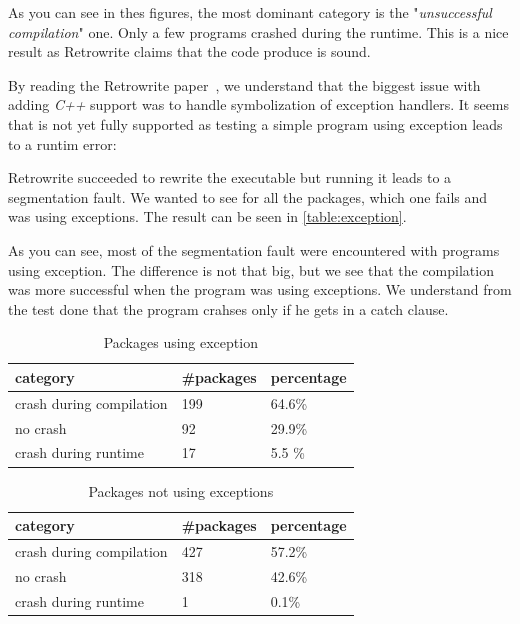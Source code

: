 \documentclass[a4paper,11pt,oneside]{report}
\newcommand{\sysname}{Retrowrite\xspace}
\begin{document}
As you can see in thes figures, the most dominant category is the
"\textit{unsuccessful compilation}" one. Only a few programs crashed during the
runtime. This is a nice result as \sysname claims that the code produce is
sound.

By reading the \sysname paper~\cite{dinesh20oakland}, we understand that
the biggest issue with adding \textit{C++} support was to handle symbolization
of exception handlers. It seems that is not yet fully supported as testing a
simple program using exception leads to a runtim error:



Retrowrite succeeded to rewrite the executable but running it leads to a segmentation fault.
We wanted to see for all the packages, which one fails and was using
exceptions. The result can be seen in \autoref{table:exception}.

As you can see, most of the segmentation fault were encountered with programs
using exception. The difference is not that big, but we see that the compilation
was more successful when the program was using exceptions. We understand from
the test done that the program crahses only if he gets in a catch clause.

\begin{table}[H]
    \centering
    \begin{tabular}{lll} 
        \hline
        category                & \#packages & percentage \\ 
        \hline
        crash during compilation & 199 & 64.6\%      \\
        no crash                 & 92  & 29.9\%       \\
        crash during runtime     & 17  & 5.5 \%       \\
        \hline
    \end{tabular}
    \caption{Packages using exception}
    \label{table:exception}
\end{table}


\begin{table}[H]
    \centering
    \begin{tabular}{lll} 
        \hline
        category                & \#packages & percentage \\ 
        \hline
        crash during compilation & 427  & 57.2\%      \\
        no crash                 & 318  & 42.6\%      \\
        crash during runtime     & 1    & 0.1\%      \\
        \hline
    \end{tabular}
    \caption{Packages not using exceptions}
\end{table}
\end{document}
